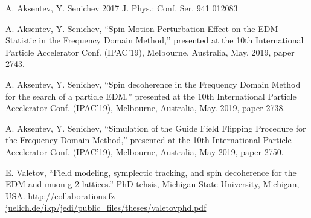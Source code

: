 \documentclass[a4paper]{jacow}
\begin{document}
\begin{thebibliography}{9}
  A. Aksentev, Y. Senichev 2017 J. Phys.: Conf. Ser. 941 012083

  A. Aksentev, Y. Senichev, ``Spin Motion Perturbation Effect on the EDM Statistic
  in the Frequency Domain Method,'' presented at the 10th International Particle Accelerator Conf. (IPAC'19),
  Melbourne, Australia, May. 2019, paper 2743.

  A. Aksentev, Y. Senichev, ``Spin decoherence in the Frequency Domain Method for the search of a particle EDM,''
  presented at the 10th International Particle Accelerator Conf. (IPAC'19), Melbourne, Australia,
  May. 2019, paper 2738.

  A. Aksentev, Y. Senichev, ``Simulation of the Guide Field Flipping Procedure for the Frequency Domain Method,'' 
  presented at the 10th International Particle Accelerator Conf. (IPAC'19), Melbourne, Australia,
  May 2019, paper 2750.

  E. Valetov, ``Field modeling, symplectic tracking, and spin decoherence for the EDM and muon g-2 lattices.''
  PhD tehsis, Michigan State University, Michigan, USA.
  \url{http://collaborations.fz-juelich.de/ikp/jedi/public_files/theses/valetovphd.pdf}
  


\end{thebibliography}
\end{document}
